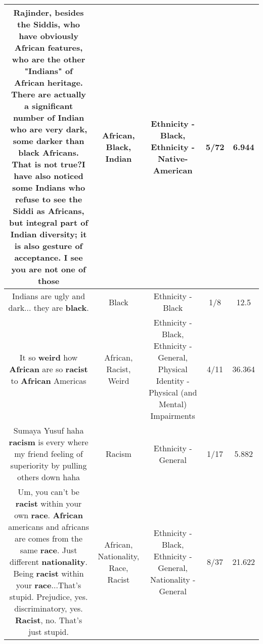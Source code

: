 \documentclass[11pt]{article}
\newlength\mylength
\begin{document}
\begin{center}
\begin{longtable}{|C{.65\mylength}|C{.30\mylength}|C{.12\mylength}|C{.12\mylength}|C{.12\mylength}|}
  \small Rajinder, besides the Siddis, who have obviously \textbf{African} features, who are the other "Indians" of \textbf{African} heritage.  There are actually a significant number of \textbf{Indian} who are  very dark, some darker than \textbf{black} Africans. That is not true?I have also noticed some Indians who refuse to see  the Siddi as Africans, but integral part of \textbf{Indian} diversity;  it is also  gesture of acceptance. I see you are not one of  those\normalsize   & African, Black, Indian & Ethnicity - Black, Ethnicity - Native-American & 5/72 & 6.944 \\  \hline
  \small Indians are ugly and dark... they are \textbf{black}.\normalsize   & Black & Ethnicity - Black & 1/8 & 12.5 \\  \hline
  \small It so \textbf{weird} how \textbf{African} are so \textbf{racist} to \textbf{African} Americas\normalsize   & African, Racist, Weird & Ethnicity - Black, Ethnicity - General, Physical Identity - Physical (and Mental) Impairments & 4/11 & 36.364 \\  \hline
  \small Sumaya Yusuf haha \textbf{racism} is every where my friend feeling of superiority by pulling others down haha\normalsize   & Racism & Ethnicity - General & 1/17 & 5.882 \\  \hline
  \small Um, you can't be \textbf{racist} within your own \textbf{race}. \textbf{African} americans and africans are comes from the same \textbf{race}. Just different \textbf{nationality}. Being \textbf{racist} within your \textbf{race}...That's stupid. Prejudice, yes. discriminatory, yes. \textbf{Racist}, no. That's just stupid.\normalsize   & African, Nationality, Race, Racist & Ethnicity - Black, Ethnicity - General, Nationality - General & 8/37 & 21.622 \\  \hline

\end{longtable}
\end{center}
\end{document}
